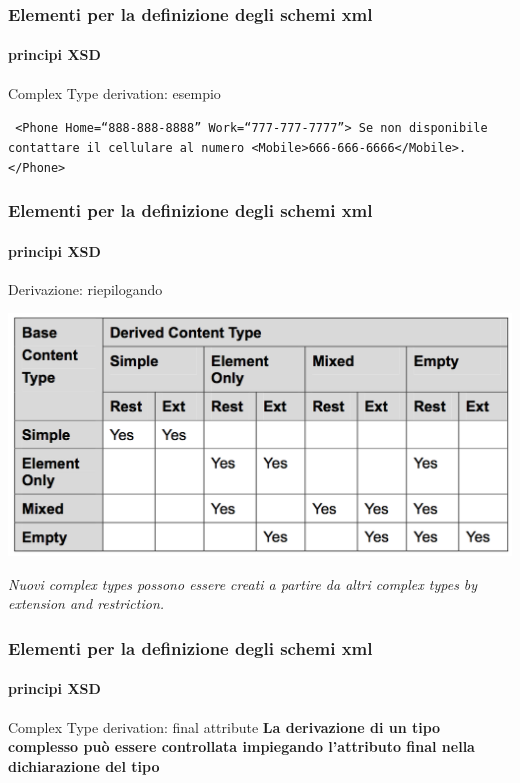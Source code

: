 \begin{frame}
	\frametitle{Elementi per la definizione degli schemi xml}
	\framesubtitle{principi XSD}
	\addtocounter{nframe}{1}

	\begin{block}{Complex Type derivation: esempio}

		\texttt{
			<Phone Home=``888-888-8888'' Work=``777-777-7777''>
			Se non disponibile contattare il cellulare al numero
			<Mobile>666-666-6666</Mobile>.
			</Phone>
		}
	\end{block}
\end{frame}




\begin{frame}
	\frametitle{Elementi per la definizione degli schemi xml}
	\framesubtitle{principi XSD}
	\addtocounter{nframe}{1}

	\begin{block}{Derivazione: riepilogando}

		\includegraphics[width=.95\textwidth]{imgs/TabellaContentTypeDerivation.png}

	\end{block}

	\begin{tiny}
		\textit{Nuovi complex types possono essere creati a partire da altri complex types by extension and restriction.}
	\end{tiny}
\end{frame}



\begin{frame}
	\frametitle{Elementi per la definizione degli schemi xml}
	\framesubtitle{principi XSD}
	\addtocounter{nframe}{1}

	\begin{block}{Complex Type derivation: final attribute}
		\textbf{La derivazione di un tipo complesso può essere controllata impiegando l'attributo final nella dichiarazione del tipo}
	\end{block}

\end{frame}


